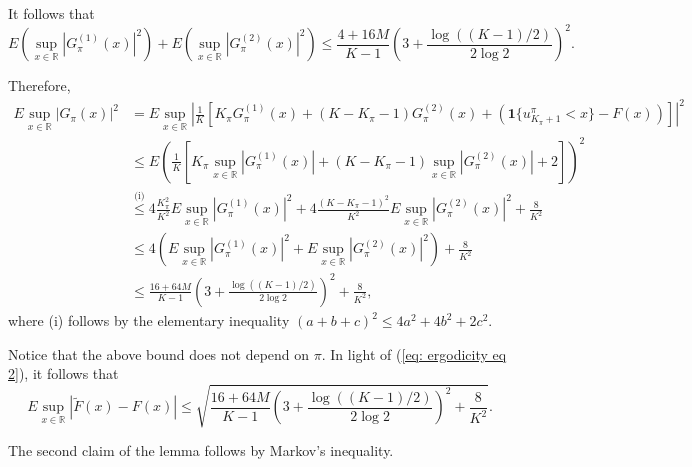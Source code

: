 \documentclass[final,12pt]{colt2018} %
\begin{document}
It follows that 
\[
E\left(\sup_{x\in\mathbb{R}}\left|G_{\pi}^{(1)}(x)\right|^{2}\right)+E\left(\sup_{x\in\mathbb{R}}\left|G_{\pi}^{(2)}(x)\right|^{2}\right)\leq\frac{4+16M}{K-1}\left(3+\frac{\log((K-1)/2)}{2\log2}\right)^{2}.
\]

Therefore, 
\begin{align*}
E\sup_{x\in\mathbb{R}}\left|G_{\pi}(x)\right|^{2} & =E\sup_{x\in\mathbb{R}}\left|\frac{1}{K}\left[K_{\pi}G_{\pi}^{(1)}(x)+(K-K_{\pi}-1)G_{\pi}^{(2)}(x)+\left(\mathbf{1}\{u_{K_{\pi}+1}^{\pi}<x\}-F(x)\right)\right]\right|^{2}\\
 & \leq E\left(\frac{1}{K}\left[K_{\pi}\sup_{x\in\mathbb{R}}\left|G_{\pi}^{(1)}(x)\right|+(K-K_{\pi}-1)\sup_{x\in\mathbb{R}}\left|G_{\pi}^{(2)}(x)\right|+2\right]\right)^{2}\\
 & \overset{\text{(i)}}{\leq}4\frac{K_{\pi}^{2}}{K^{2}}E\sup_{x\in\mathbb{R}}\left|G_{\pi}^{(1)}(x)\right|^{2}+4\frac{(K-K_{\pi}-1)^{2}}{K^{2}}E\sup_{x\in\mathbb{R}}\left|G_{\pi}^{(2)}(x)\right|^{2}+\frac{8}{K^{2}}\\
 & \leq4\left(E\sup_{x\in\mathbb{R}}\left|G_{\pi}^{(1)}(x)\right|^{2}+E\sup_{x\in\mathbb{R}}\left|G_{\pi}^{(2)}(x)\right|^{2}\right)+\frac{8}{K^{2}}\\
 & \leq\frac{16+64M}{K-1}\left(3+\frac{\log((K-1)/2)}{2\log2}\right)^{2}+\frac{8}{K^{2}},
\end{align*}
where (i) follows by the elementary inequality $(a+b+c)^{2}\leq4a^{2}+4b^{2}+2c^{2}$. 

Notice that the above bound does not depend on $\pi$. In light of
(\ref{eq: ergodicity eq 2}), it follows that 
\[
E\sup_{x\in\mathbb{R}}\left|\tilde{F}(x)-F(x)\right|\leq\sqrt{\frac{16+64M}{K-1}\left(3+\frac{\log((K-1)/2)}{2\log2}\right)^{2}+\frac{8}{K^{2}}}.
\]

The second claim of the lemma follows by Markov's inequality. 
\end{document}
